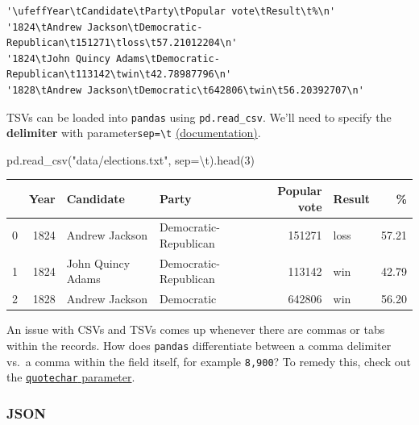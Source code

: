 \documentclass[
  letterpaper,
  DIV=11,
  numbers=noendperiod]{scrreprt}
\newenvironment{Shaded}{\begin{snugshade}}{\end{snugshade}}
\newcommand{\CharTok}[1]{\textcolor[rgb]{0.13,0.47,0.30}{#1}}
\newcommand{\DecValTok}[1]{\textcolor[rgb]{0.68,0.00,0.00}{#1}}
\newcommand{\NormalTok}[1]{\textcolor[rgb]{0.00,0.23,0.31}{#1}}
\newcommand{\OperatorTok}[1]{\textcolor[rgb]{0.37,0.37,0.37}{#1}}
\newcommand{\StringTok}[1]{\textcolor[rgb]{0.13,0.47,0.30}{#1}}
\begin{document}
\begin{verbatim}
'\ufeffYear\tCandidate\tParty\tPopular vote\tResult\t%\n'
'1824\tAndrew Jackson\tDemocratic-Republican\t151271\tloss\t57.21012204\n'
'1824\tJohn Quincy Adams\tDemocratic-Republican\t113142\twin\t42.78987796\n'
'1828\tAndrew Jackson\tDemocratic\t642806\twin\t56.20392707\n'
\end{verbatim}

TSVs can be loaded into \texttt{pandas} using \texttt{pd.read\_csv}.
We'll need to specify the \textbf{delimiter} with
parameter\texttt{sep=\textquotesingle{}\textbackslash{}t\textquotesingle{}}
\href{https://pandas.pydata.org/docs/reference/api/pandas.read_csv.html}{(documentation)}.

\begin{Shaded}
\begin{Highlighting}[]
\NormalTok{pd.read\_csv(}\StringTok{"data/elections.txt"}\NormalTok{, sep}\OperatorTok{=}\StringTok{\textquotesingle{}}\CharTok{\textbackslash{}t}\StringTok{\textquotesingle{}}\NormalTok{).head(}\DecValTok{3}\NormalTok{)}
\end{Highlighting}
\end{Shaded}

\begin{tabular}{lrllrlr}
\toprule
{} &  Year &          Candidate &                  Party &  Popular vote & Result &     \% \\
\midrule
0 &  1824 &     Andrew Jackson &  Democratic-Republican &        151271 &   loss & 57.21 \\
1 &  1824 &  John Quincy Adams &  Democratic-Republican &        113142 &    win & 42.79 \\
2 &  1828 &     Andrew Jackson &             Democratic &        642806 &    win & 56.20 \\
\bottomrule
\end{tabular}

An issue with CSVs and TSVs comes up whenever there are commas or tabs
within the records. How does \texttt{pandas} differentiate between a
comma delimiter vs.~a comma within the field itself, for example
\texttt{8,900}? To remedy this, check out the
\href{https://pandas.pydata.org/docs/reference/api/pandas.read_csv.html}{\texttt{quotechar}
parameter}.

\hypertarget{json}{%
\subsubsection{JSON}\label{json}}
\end{document}
